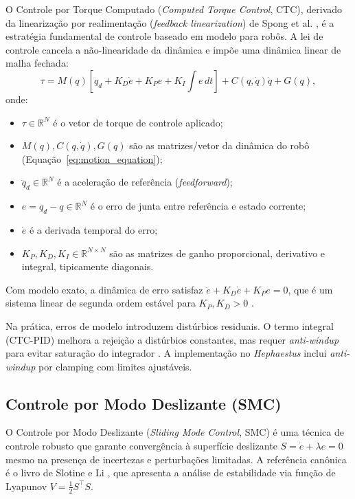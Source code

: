 O Controle por Torque Computado (\textit{Computed Torque Control}, CTC), derivado da linearização por realimentação (\textit{feedback linearization}) de Spong et al. \cite{spong2008robot}, é a estratégia fundamental de controle baseado em modelo para robôs. A lei de controle cancela a não-linearidade da dinâmica e impõe uma dinâmica linear de malha fechada:
\begin{equation}
    \tau = M(q)\left[\ddot{q}_d + K_D\dot{e} + K_P e + K_I \int e\, dt\right] + C(q,\dot{q})\dot{q} + G(q),
    \label{eq:ctc_pid}
\end{equation}
onde:
\begin{itemize}
    \item $\tau \in \mathbb{R}^{N}$ é o vetor de torque de controle aplicado;
    \item $M(q), C(q,\dot{q}), G(q)$ são as matrizes/vetor da dinâmica do robô (Equação~\eqref{eq:motion_equation});
    \item $\ddot{q}_d \in \mathbb{R}^{N}$ é a aceleração de referência (\textit{feedforward});
    \item $e = q_d - q \in \mathbb{R}^{N}$ é o erro de junta entre referência e estado corrente;
    \item $\dot{e}$ é a derivada temporal do erro;
    \item $K_P, K_D, K_I \in \mathbb{R}^{N\times N}$ são as matrizes de ganho proporcional, derivativo e integral, tipicamente diagonais.
\end{itemize}
Com modelo exato, a dinâmica de erro satisfaz $\ddot{e} + K_D\dot{e} + K_P e = 0$, que é um sistema linear de segunda ordem estável para $K_P, K_D > 0$ \cite{craig1989introduction}.

Na prática, erros de modelo introduzem distúrbios residuais. O termo integral (CTC-PID) melhora a rejeição a distúrbios constantes, mas requer \textit{anti-windup} para evitar saturação do integrador \cite{astrom1995theory}. A implementação no \textit{Hephaestus} inclui \textit{anti-windup} por clamping com limites ajustáveis.

\subsection{Controle por Modo Deslizante (SMC)}

O Controle por Modo Deslizante (\textit{Sliding Mode Control}, SMC) é uma técnica de controle robusto que garante convergência à superfície deslizante $S = \dot{e} + \lambda e = 0$ mesmo na presença de incertezas e perturbações limitadas. A referência canônica é o livro de Slotine e Li \cite{slotine1991applied}, que apresenta a análise de estabilidade via função de Lyapunov $V = \frac{1}{2}S^\top S$.

